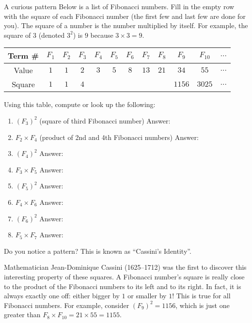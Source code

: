 \documentclass[12pt,letterpaper]{article}
\begin{document}
\begin{problem}{A curious pattern}
 Below is a list of Fibonacci numbers. Fill in the empty row with the square of
 each Fibonacci number (the first few and last few are done for you). The square
 of a number is the number multiplied by itself. For example, the square of $3$
 (denoted $3^2$) is $9$ because $3 \times 3=9$.

 \begin{center}
 \begin{tabular}{|c|c|c|c|c|c|c|c|c|c|c|c|}
 \hline
  Term \# & $F_1$ & $F_2$ & $F_3$ & $F_4$ & $F_5$ & $F_6$ & $F_7$ & $F_8$ &
  $F_9$ & $F_{10}$ & $\ldots$ \\
  \hline Value & $1$ & $1$ & $2$ & $3$ & $5$ & $8$ & $13$ & $21$ & $34$ & $55$ &
  $\ldots$ \\
  \hline Square & $1$ & $1$ & $4$ & & & & & & $1156$ & $3025$ & $\ldots$ \\
  \hline
 \end{tabular}
 \end{center}

 Using this table, compute or look up the following:

 \begin{enumerate}
  \item $\left(F_3\right)^2$ (square of third Fibonacci number) \hfill Answer:
  \underline{\hspace{4em}}
  \item $F_2 \times F_4$ (product of 2nd and 4th Fibonacci numbers) \hfill
  Answer: \underline{\hspace{4em}}
  \item $\left(F_4\right)^2$ \hfill Answer: \underline{\hspace{4em}}
  \item $F_3 \times F_5$ \hfill Answer: \underline{\hspace{4em}}
  \item $\left(F_5\right)^2$ \hfill Answer: \underline{\hspace{4em}}
  \item $F_4 \times F_6$ \hfill Answer: \underline{\hspace{4em}}
  \item $\left(F_6\right)^2$ \hfill Answer: \underline{\hspace{4em}}
  \item $F_5 \times F_7$ \hfill Answer: \underline{\hspace{4em}}
 \end{enumerate}

 Do you notice a pattern? This is known as ``Cassini's Identity''.

 Mathematician Jean-Dominique Cassini (1625--1712) was the first to discover
 this interesting property of these squares. A Fibonacci number's square is
 really close to the product of the Fibonacci numbers to its left and to its
 right. In fact, it is always exactly one off: either bigger by $1$ or smaller
 by $1$! This is true for all Fibonacci numbers. For example, consider
 $\left(F_9\right)^2=1156$, which is just one greater than $F_8 \times F_{10} =
 21 \times 55 = 1155$.
\end{problem}
\end{document}
